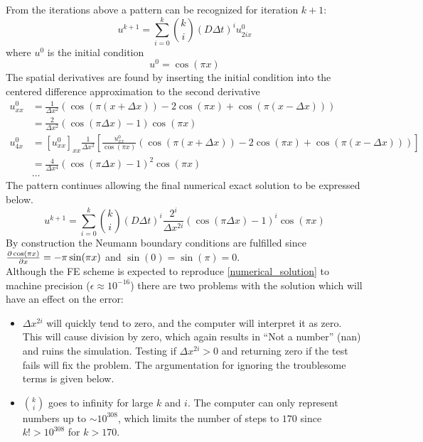 \noindent From the iterations above a pattern can be recognized for iteration $k+1$:\\
\begin{equation}
 u^{k+1} = \sum\limits_{i=0}^k {k\choose i}\left(D\Delta t\right)^iu^0_{2ix}
\end{equation}
where $u^0$ is the initial condition
\begin{equation}
 u^0 = \cos(\pi x)
\end{equation}
The spatial derivatives are found by inserting the initial condition into the centered difference approximation to the second derivative 
\begin{align*}
 u^0_{xx} &= \frac{1}{\Delta x^2}\left(\cos(\pi(x+\Delta x)) -2\cos(\pi x) +\cos(\pi(x-\Delta x))\right) \\
 &= \frac{2}{\Delta x^2}\left(\cos(\pi\Delta x)-1\right)\cos(\pi x)\\
 u^0_{4x} &= [u^0_{xx}]_{xx} \frac{1}{\Delta x^2}\left[\frac{u^0_{xx}}{\cos(\pi x)}\left(\cos(\pi(x+\Delta x)) -2\cos(\pi x) +\cos(\pi(x-\Delta x))\right)\right]\\
 &= \frac{4}{\Delta x^4}\left(\cos(\pi\Delta x)-1\right)^2\cos(\pi x)\\
 &\dots
\end{align*}
The pattern continues allowing the final numerical exact solution to be expressed below.
\begin{equation}\label{numerical_solution}
  u^{k+1} = \sum\limits_{i=0}^k {k\choose i}\left(D\Delta t\right)^i\frac{2^i}{\Delta x^{2i}}\left(\cos(\pi\Delta x)-1\right)^i\cos(\pi x)
\end{equation}
By construction the Neumann boundary conditions are fulfilled since $\frac{\partial \cos(\pi x)}{\partial x} = -\pi\sin(\pi x)$ and $\sin(0) = \sin(\pi) = 0$. \\

Although the FE scheme is expected to reproduce \eqref{numerical_solution} to machine precision ($\epsilon \approx 10^{-16}$) there are two problems with the solution which will have an effect on the error:
\begin{itemize}
 \item $\Delta x^{2i}$ will quickly tend to zero, and the computer will interpret it as zero. This will cause division by zero, which again results in ``Not a number'' (nan) and ruins the simulation. Testing if $\Delta x^{2i}>0$ and returning zero if the test fails will fix the problem. The argumentation for ignoring the troublesome terms is given below.
 \item ${k\choose i}$ goes to infinity for large $k$ and $i$. The computer can only represent numbers up to $\sim10^{308}$, which limits the number of steps to $170$ since $k!>10^{308}$ for $k>170$.
\end{itemize}

